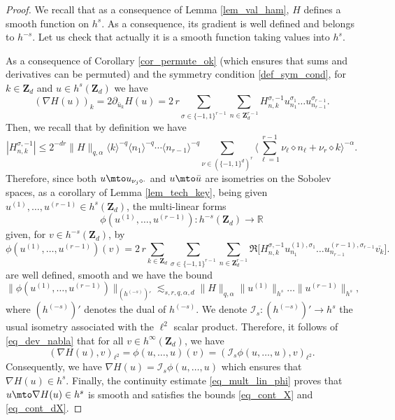 \begin{proof} We recall that as a consequence of Lemma \ref{lem_val_ham}, $H$ defines a smooth function on $h^{s}$. As a consequence, its gradient is well defined and belongs to $h^{-s}$. Let us check that actually it is a smooth function taking values into $h^s$.

As a consequence of Corollary \ref{cor_permute_ok} (which ensures that sums and derivatives can be permuted) and the symmetry condition \eqref{def_sym_cond}, for $k\in \mathbf{Z}_d$ and $u \in h^s(\mathbf{Z}_d)$ we have
\begin{equation}
\label{eq_dev_nabla}
(\nabla H(u))_k = 2\partial_{\bar{u}_k} H(u) = 2\,r \sum_{\sigma \in \{-1,1\}^{r-1}} \sum_{n\in \mathbf{Z}_d^{r-1} } H_{n,k}^{\sigma,-1} u_{n_1}^{\sigma_1} \dots u_{n_{r-1}}^{\sigma_{r-1}}.
\end{equation}
Then, we recall that by definition we have
\[
|H_{n,k}^{\sigma,-1}| \leq 2^{-dr} \| H\|_{q,\alpha} \langle k \rangle^{-q} \langle n_1 \rangle^{-q} \cdots \langle n_{r-1} \rangle^{-q} \sum_{\nu \in (\{-1,1\}^d)^r} \biggl\langle \sum_{\ell =1}^{r-1} \nu_{\ell} \diamond n_{\ell} + \nu_{r} \diamond k \biggr\rangle^{-\alpha}.
\]
Therefore, since both $u\mto u_{\nu_j \diamond \cdot}$ and $u\mto \bar u$ are isometries on the Sobolev spaces, as a corollary of Lemma \ref{lem_tech_key}, being given $u^{(1)},\dots,u^{(r-1)}\in h^s(\mathbf{Z}_d)$, the multi-linear forms
\[
\phi(u^{(1)},\dots,u^{(r-1)}): h^{-s}(\mathbf{Z}_d) \to \mathbb{R}
\]
given, for $v\in h^{-s}(\mathbf{Z}_d)$, by
\[
\phi(u^{(1)},\dots,u^{(r-1)}) (v) = 2\,r \displaystyle \sum_{k\in \mathbf{Z}_d} \sum_{\sigma \in \{-1,1\}^{r-1}} \sum_{n\in \mathbf{Z}_d^{r-1} } \Re \bigl[H_{n,k}^{\sigma,-1} u_{n_1}^{(1),\sigma_1} \dots u_{n_{r-1}}^{(r-1),\sigma_{r-1}} \overline{v_k} \bigr].
\]
are well defined, smooth and we have the bound
\begin{equation}
\label{eq_mult_lin_phi}
\|\phi(u^{(1)},\dots,u^{(r-1)})\|_{(h^{(-s)})'} \lesssim_{s,r,q,\alpha,d} \| H\|_{q,\alpha} \| u^{(1)} \|_{h^s} \dots \| u^{(r-1)} \|_{h^s},
\end{equation}
where $(h^{(-s)})'$ denotes the dual of $h^{(-s)}$. We denote $\mathcal{I}_s:(h^{(-s)})'\to h^s $ the usual isometry associated with the $\ell^2$ scalar product.
Therefore, it follows of \eqref{eq_dev_nabla} that for all $v\in h^\infty(\mathbf{Z}_d)$, we have
\[
(\nabla H(u),v)_{\ell^2} = \phi(u,\dots,u)(v) = (\mathcal{I}_s \phi(u,\dots,u),v)_{\ell^2}.
\]
Consequently, we have $\nabla H(u)=\mathcal{I}_s \phi(u,\dots,u)$ which ensures that $\nabla H(u) \in h^s$. \hbox{Finally}, the continuity estimate \eqref{eq_mult_lin_phi} proves that $u\mto \nabla H(u)\in h^s$ is smooth and satisfies the bounds \eqref{eq_cont_X} and \eqref{eq_cont_dX}.
\end{proof}

